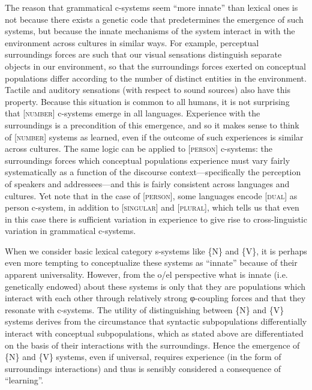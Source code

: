The reason that grammatical c-systems seem “more innate” than lexical ones is not because there exists a genetic code that predetermines the emergence of such systems, but because the innate mechanisms of the system interact in with the environment across cultures in similar ways. For example, perceptual surroundings forces are such that our visual sensations distinguish separate objects in our environment, so that the surroundings forces exerted on conceptual populations differ according to the number of distinct entities in the environment. Tactile and auditory sensations (with respect to sound sources) also have this property. Because this situation is common to all humans, it is not surprising that [\textsc{number}] c-systems emerge in all languages. Experience with the surroundings is a precondition of this emergence, and so it makes sense to think of [\textsc{number}] systems as learned, even if the outcome of such experiences is similar across cultures. The same logic can be applied to [\textsc{person}] c-systems: the surroundings forces which conceptual populations experience must vary fairly systematically as a function of the discourse context—specifically the perception of speakers and addressees—and this is fairly consistent across languages and cultures. Yet note that in the case of [\textsc{person}], some languages encode [\textsc{dual}] as person c-system, in addition to [\textsc{singular}] and [\textsc{plural}], which tells us that even in this case there is sufficient variation in experience to give rise to cross-linguistic variation in grammatical c-systems.

When we consider basic lexical category s-systems like \{N\} and \{V\}, it is perhaps even more tempting to conceptualize these systems as “innate” because of their apparent universality. However, from the o/el perspective what is innate (i.e. genetically endowed) about these systems is only that they are populations which interact with each other through relatively strong φ{}-coupling forces and that they resonate with c-systems. The utility of distinguishing between \{N\} and \{V\} systems derives from the circumstance that syntactic subpopulations differentially interact with conceptual subpopulations, which as stated above are differentiated on the basis of their interactions with the surroundings. Hence the emergence of \{N\} and \{V\} systems, even if universal, requires experience (in the form of surroundings interactions) and thus is sensibly considered a consequence of “learning”. 


